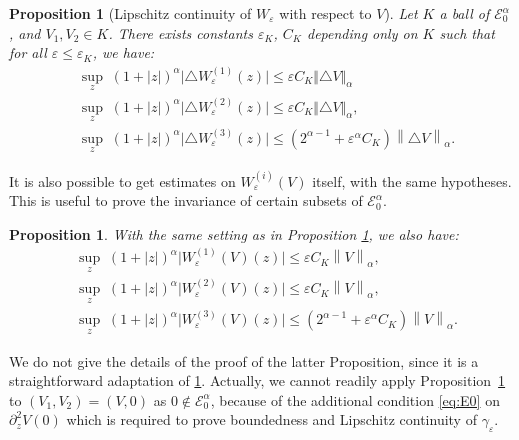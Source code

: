 \documentclass[JEP,XML,SOM,Unicode]{cedram}
\let\mathcal\mathscr
\theoremstyle{plain}
\newtheorem{prop}[thm]{Proposition}
\theoremstyle{definition}
\let\eps\varepsilon
\let\ds\displaystyle
\newcommand{\norm}[1]{\left\lVert#1\right\rVert}
\newcommand{\nalph}[1]{\left\lVert#1\right\rVert_\alpha}
\newcommand{\Eaz}{\mathcal{E}^\alpha_0}
\begin{document}
\begin{prop}[Lipschitz continuity of $W_\eps$ with respect to $V$]\label{unif boundsDeltaW}
Let $K$ a ball of $\Eaz$, and $V_1, V_2 \in K $. There exists constants $\eps_K$, $C_K$ depending only on $K$ such that for all $\eps \leq \eps_K$, we have:
\begin{align}
& \label{estim Delta 1} \ds \sup_z\; (1+|z|)^\alpha \vert\triangle W_\eps^{(1)}	(z) \vert \leq \eps C_K \Vert \triangle V \Vert_\alpha\\
& \label{estim Delta 2} \ds \sup_z\; (1+|z|)^\alpha \vert\triangle W_\eps^{(2)}(z) \vert \leq \eps C_K \Vert \triangle V \Vert_\alpha, \\
& \label{estim Delta 3} \ds \sup_z \; (1+|z|)^\alpha \vert\triangle W_\eps^{(3)}(z)\vert \leq \left(2^{\alpha-1} + \eps^\alpha C_K \right)\norm{\triangle V}_\alpha.
\end{align}
\end{prop}

It is also possible to get estimates on $W_\eps^{(i)}(V)$ itself, with the same hypotheses. This is useful to prove the invariance of certain subsets of $\Eaz$.
\begin{prop}\label{unif boundsW}
With the same setting as in Proposition \ref{unif boundsDeltaW}, we also have:
\begin{align*}
& \ds \sup_z \; (1+|z|)^\alpha \vert W^{(1)}_\eps(V)(z)\vert \leq \eps C_K \nalph{V},\\
& \ds \sup_z \; (1+|z|)^\alpha \vert W^{(2)}_\eps(V)(z)\vert \leq \eps C_K \nalph{V},\\
& \ds \sup_z \; (1+|z|)^\alpha \vert W_\eps^{(3)}(V)(z) \vert \leq \left(2^{\alpha-1} + \eps^\alpha C_K \right) \nalph{V}.
\end{align*}
\end{prop}

We do not give the details of the proof of the latter Proposition, since it is a straightforward adaptation of \cref{unif boundsDeltaW}. Actually, we cannot readily apply Proposition~\ref{unif boundsDeltaW} to $(V_1,V_2) = (V,0)$ as $0\notin \Eaz$, because of the additional condition \eqref{eq:E0} on $\partial_z^2V(0)$ which is required to prove boundedness and Lipschitz continuity of $\gamma_\eps$.
\end{document}
